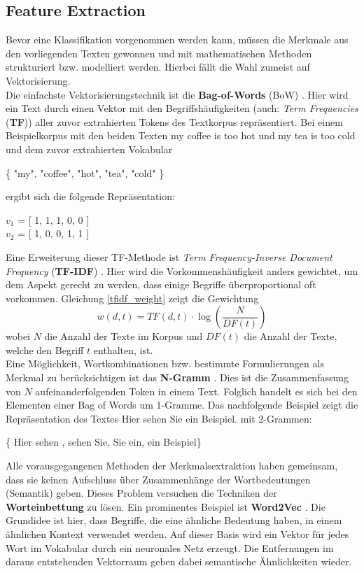 \subsection{Feature Extraction}
Bevor eine Klassifikation vorgenommen werden kann, müssen die Merkmale aus den vorliegenden Texten gewonnen und mit mathematischen Methoden strukturiert bzw. modelliert werden. Hierbei fällt die Wahl zumeist auf Vektorisierung.\\
Die einfachste Vektorisierungstechnik ist die \textbf{Bag-of-Words} (BoW) \citep{Ramos13}. Hier wird ein Text durch einen Vektor mit den Begriffshäufigkeiten (auch: \textit{Term Frequencies} (\textbf{TF})) aller zuvor extrahierten Tokens des Textkorpus repräsentiert. Bei einem Beispielkorpus mit den beiden Texten \glqq my coffee is too hot\grqq{} und \glqq my tea is too cold\grqq{} und dem zuvor extrahierten Vokabular
\begin{flushleft}
	\hfil\{ "my", "coffee", "hot", "tea", "cold" \}
\end{flushleft}
ergibt sich die folgende Repräsentation:
\begin{flushleft}
	\hfil$v_1$ = [ 1, 1, 1, 0, 0 ]\\
	\hfil$v_2$ = [ 1, 0, 0, 1, 1 ]
\end{flushleft}
Eine Erweiterung dieser TF-Methode ist \textit{Term Frequency-Inverse Document Frequency} (\textbf{TF-IDF}) \citep{Ramos13}.  Hier wird die Vorkommenshäufigkeit anders gewichtet, um dem Aspekt gerecht zu werden, dass einige Begriffe überproportional oft vorkommen. Gleichung \ref{tfidf_weight} zeigt die Gewichtung 
\begin{equation}
	w(d,t) = TF(d,t) \cdot \log \left( \frac{N}{{DF}(t)} \right)
	\label{tfidf_weight}
\end{equation} 
wobei $N$ die Anzahl der Texte im Korpus und ${DF}(t)$ die Anzahl der Texte, welche den Begriff $t$ enthalten, ist.\\
Eine Möglichkeit, Wortkombinationen bzw. bestimmte Formulierungen als Merkmal zu berücksichtigen ist das \textbf{N-Gramm} \citep{Kow19}. Dies ist die Zusammenfassung von $N$ aufeinanderfolgenden Token in einem Text. Folglich handelt es sich bei den Elementen einer Bag of Words um 1-Gramme. Das nachfolgende Beispiel zeigt die Repräsentation des Textes \glqq Hier sehen Sie ein Beispiel.\grqq{} mit 2-Grammen:
\begin{flushleft}
	\hfil \{ \grqq Hier sehen \grqq, \grqq sehen Sie\grqq, \grqq Sie ein\grqq, \grqq ein Beispiel\grqq \}
\end{flushleft}
Alle vorausgegangenen Methoden der Merkmalsextraktion haben gemeinsam, dass sie keinen Aufschluss über Zusammenhänge der Wortbedeutungen (Semantik) geben. Dieses Problem versuchen die Techniken der \textbf{Worteinbettung} zu lösen. Ein prominentes Beispiel ist \textbf{Word2Vec} \citep{Mikolov13}. Die Grundidee ist hier, dass Begriffe, die eine ähnliche Bedeutung haben, in einem ähnlichen Kontext verwendet werden. Auf dieser Basis wird ein Vektor für jedes Wort im Vokabular durch ein neuronales Netz erzeugt. Die Entfernungen im daraus entstehenden Vektorraum geben dabei semantische Ähnlichkeiten wieder.
